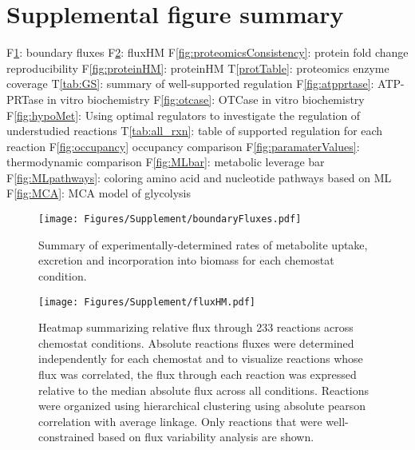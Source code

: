 \documentclass[12pt]{article}\usepackage{graphicx, color}
\begin{document}
\section*{Supplemental figure summary}

\begin{outline}
\1 F\ref{fig:boundFlux}: boundary fluxes
\1 F\ref{fig:fluxHM}: fluxHM
\1 F\ref{fig:proteomicsConsistency}: protein fold change reproducibility
\1 F\ref{fig:proteinHM}: proteinHM
\1 T\ref{protTable}: proteomics enzyme coverage
\1 T\ref{tab:GS}: summary of well-supported regulation
\1 F\ref{fig:atpprtase}: ATP-PRTase in vitro biochemistry
\1 F\ref{fig:otcase}: OTCase in vitro biochemistry
\1 F\ref{fig:hypoMet}: Using optimal regulators to investigate the regulation of understudied reactions
\1 T\ref{tab:all_rxn}: table of supported regulation for each reaction
\1 F\ref{fig:occupancy} occupancy comparison
\1 F\ref{fig:paramaterValues}: thermodynamic comparison
\1 F\ref{fig:MLbar}: metabolic leverage bar
\1 F\ref{fig:MLpathways}: coloring amino acid and nucleotide pathways based on ML
\1 F\ref{fig:MCA}: MCA model of glycolysis

\end{outline}

\newpage

\makeatletter 
\renewcommand{\thefigure}{S\@arabic\c@figure}
\renewcommand{\thetable}{S\@arabic\c@table}
\makeatother

\begin{figure}[h!]
\texttt{[image: Figures/Supplement/boundaryFluxes.pdf]}
\caption{Summary of experimentally-determined rates of metabolite uptake, excretion and incorporation into biomass for each chemostat condition. }
\label{fig:boundFlux}
\end{figure}

\begin{figure}[h!]
\texttt{[image: Figures/Supplement/fluxHM.pdf]}
\caption{Heatmap summarizing relative flux through 233 reactions across chemostat conditions.  Absolute reactions fluxes were determined independently for each chemostat and to visualize reactions whose flux was correlated, the flux through each reaction was expressed relative to the median absolute flux across all conditions.  Reactions were organized using hierarchical clustering using absolute pearson correlation with average linkage.  Only reactions that were well-constrained based on flux variability analysis are shown.}
\label{fig:fluxHM}
\end{figure}
\end{document}
